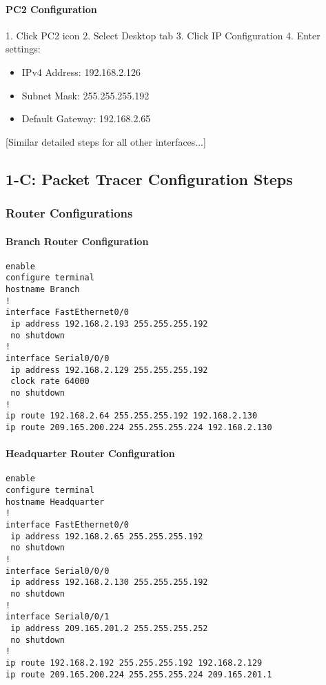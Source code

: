 \documentclass[12pt]{article}
\begin{document}
\paragraph{PC2 Configuration}
1. Click PC2 icon
2. Select Desktop tab
3. Click IP Configuration
4. Enter settings:
\begin{itemize}
    \item IPv4 Address: 192.168.2.126
    \item Subnet Mask: 255.255.255.192
    \item Default Gateway: 192.168.2.65
\end{itemize}

[Similar detailed steps for all other interfaces...]

\subsection{1-C: Packet Tracer Configuration Steps}
\subsubsection{Router Configurations}

\paragraph{Branch Router Configuration}
\begin{lstlisting}[frame=single]
enable
configure terminal
hostname Branch
!
interface FastEthernet0/0
 ip address 192.168.2.193 255.255.255.192
 no shutdown
!
interface Serial0/0/0
 ip address 192.168.2.129 255.255.255.192
 clock rate 64000
 no shutdown
!
ip route 192.168.2.64 255.255.255.192 192.168.2.130
ip route 209.165.200.224 255.255.255.224 192.168.2.130
\end{lstlisting}

\paragraph{Headquarter Router Configuration}
\begin{lstlisting}[frame=single]
enable
configure terminal
hostname Headquarter
!
interface FastEthernet0/0
 ip address 192.168.2.65 255.255.255.192
 no shutdown
!
interface Serial0/0/0
 ip address 192.168.2.130 255.255.255.192
 no shutdown
!
interface Serial0/0/1
 ip address 209.165.201.2 255.255.255.252
 no shutdown
!
ip route 192.168.2.192 255.255.255.192 192.168.2.129
ip route 209.165.200.224 255.255.255.224 209.165.201.1
\end{lstlisting}
\end{document}
